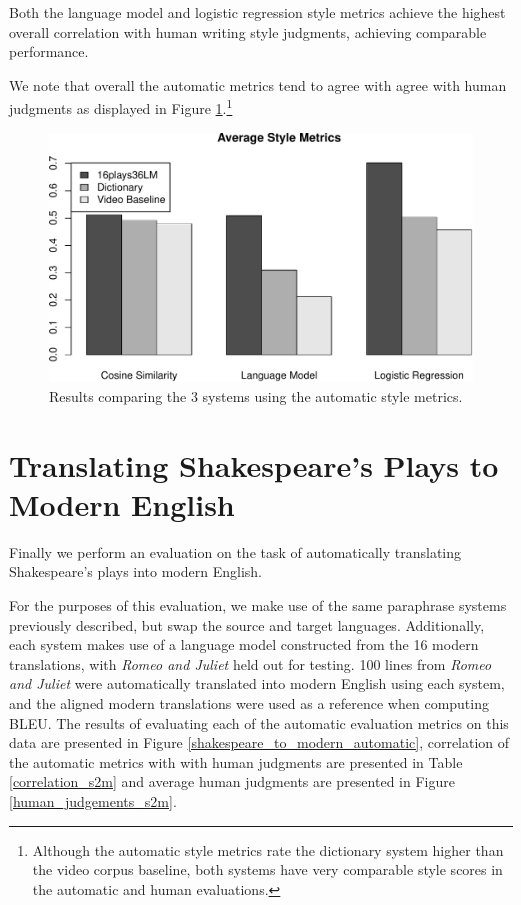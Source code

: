 \documentclass[10pt,a5paper,twoside]{article}
\begin{document}
Both the language model and logistic regression style metrics achieve the highest overall correlation with human writing style judgments, achieving comparable performance.

We note that overall the automatic metrics tend to agree with agree with human judgments as displayed in Figure \ref{style_metrics}.\footnote{
  Although the automatic style metrics rate the dictionary system higher than the video corpus baseline, both systems have very comparable
  style scores in the automatic and human evaluations.
}

\begin{figure}
  \begin{center}
    \includegraphics[width=5in]{figures/style_metrics-crop.pdf}
    \end{center}
    \caption{Results comparing the 3 systems using the automatic style metrics.}
    \label{style_metrics}
\end{figure}

\section{Translating Shakespeare's Plays to Modern English}
Finally we perform an evaluation on the task of automatically translating Shakespeare's plays into modern English.  

For the purposes of this evaluation, 
we make use of the same paraphrase systems previously described, but swap the source and target languages.
Additionally, each system makes use of a language model constructed from the 16 modern translations, with {\em Romeo and Juliet} held out for testing.  
100 lines from {\em Romeo and Juliet} were automatically translated into modern English using each system, and the aligned modern 
translations were used as a reference when computing BLEU.  The results of evaluating each of the automatic evaluation metrics on this
data are presented in Figure \ref{shakespeare_to_modern_automatic}, correlation of the automatic metrics with with human judgments are presented in 
Table \ref{correlation_s2m} and average human judgments are presented in Figure \ref{human_judgements_s2m}.
\end{document}
